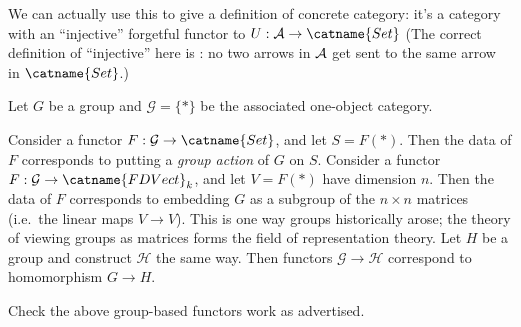 \begin{remark}
	We can actually use this to give a definition of concrete category:
	it's a category with an ``injective'' forgetful functor to $U: \AA \to \catname{Set}$
	(The correct definition of ``injective'' here is : no two arrows in $\AA$
	get sent to the same arrow in $\catname{Set}$.)
\end{remark}

\begin{example}
	Let $G$ be a group and $\mathcal G = \{\ast\}$ be the associated one-object category.
	\begin{enumerate}[(a)]
		\ii Consider a functor $F : \mathcal G \to \catname{Set}$, and let $S = F(\ast)$.
		Then the data of $F$ corresponds to putting a \emph{group action} of $G$ on $S$.
		\ii Consider a functor $F : \mathcal G \to \catname{FDVect}_k$, and let $V = F(\ast)$ have dimension $n$.
		Then the data of $F$ corresponds to embedding $G$ as a subgroup of the $n \times n$ matrices
		(i.e.\ the linear maps $V \to V$).
		This is one way groups historically arose; the theory of viewing groups as matrices
		forms the field of representation theory.
		\ii Let $H$ be a group and construct $\mathcal H$ the same way.
		Then functors $\mathcal G \to \mathcal H$ correspond to homomorphism $G \to H$.
	\end{enumerate}
\end{example}
\begin{exercise}
	Check the above group-based functors work as advertised.
\end{exercise}

